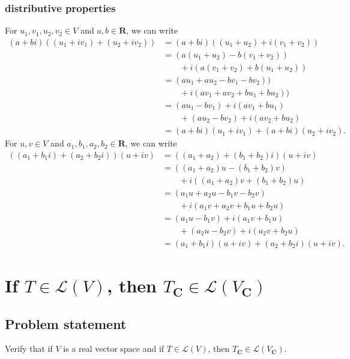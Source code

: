 \documentclass{article}
\begin{document}
\subsubsection*{distributive properties}
For $u_1,v_1,u_2,v_2\in V$ and $a,b\in\mathbf{R}$, we can write
\begin{align*}
    (a+bi)((u_1+iv_1)+(u_2+iv_2))&=(a+bi)((u_1+u_2)+i(v_1+v_2))\\
    &=(a(u_1+u_2)-b(v_1+v_2))\\
    &\qquad+i(a(v_1+v_2) + b(u_1+u_2))\\
    &=(au_1+au_2-bv_1-bv_2))\\
    &\qquad+i(av_1+av_2 + bu_1+bu_2))\\
    &=(au_1-bv_1)+i(av_1+bu_1)\\
    &\qquad+(au_2-bv_2)+i(av_2+bu_2)\\
    &=(a+bi)(u_1+iv_1)+(a+bi)(u_2+iv_2).
\end{align*}
For $u,v\in V$ and $a_1,b_1,a_2,b_2\in\mathbf{R}$, we can write
\begin{align*}
    ((a_1+b_1i)+(a_2+b_2i))(u+iv)&=((a_1+a_2)+(b_1+b_2)i)(u+iv)\\
    &=((a_1+a_2)u-(b_1+b_2)v)\\
    &\qquad+i((a_1+a_2)v+(b_1+b_2)u)\\
    &=(a_1u+a_2u-b_1v-b_2v)\\
    &\qquad+i(a_1v+a_2v+b_1u+b_2u)\\
    &=(a_1u-b_1v)+i(a_1v+b_1u)\\
    &\qquad+(a_2u-b_2v)+i(a_2v+b_2u)\\
    &=(a_1+b_1i)(u+iv)+(a_2+b_2i)(u+iv).
\end{align*}

\clearpage

\section{If $T\in\mathcal{L}(V)$, then $T_{\mathbf{C}}\in\mathcal{L}(V_{\mathbf{C}})$}
\subsection*{Problem statement}
Verify that if $V$ is a real vector space and if $T\in\mathcal{L}(V)$, then $T_{\mathbf{C}}\in\mathcal{L}(V_{\mathbf{C}})$.
\end{document}
